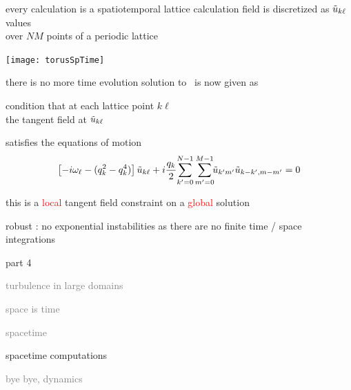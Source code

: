 \begin{frame}{every calculation is a spatiotemporal lattice calculation}
field is discretized as
$\tilde{u}_{k\ell}$ values  \\ over
$N M$ points of a periodic lattice


\begin{center}
\texttt{[image: torusSpTime]}
\end{center}
\end{frame}


\begin{frame}{there is no more time evolution}
solution to \KS\ is now given as
\begin{block}{condition that}
at each lattice point $k\ell$ \\
the tangent field at $\tilde{u}_{k\ell}$
\end{block}
satisfies the equations of motion
\[
\left[- i \omega_\ell - ( q_k^2 - q_k^4 ) \right]\tilde{u}_{k\ell}
+ i \frac{q_k}{2} \!\sum_{k'=0}^{N-1} \sum^{M-1}_{m'=0}\!\!
\tilde{u}_{k'm'} \tilde{u}_{k-k',m-m'}
    =
0
\]

\bigskip

this is a \textcolor{red}{local} tangent field constraint on a \textcolor{red}{global} solution

\bigskip

robust : no exponential instabilities as there are no finite time / space integrations

\end{frame}

\begin{frame}{part 4}
\begin{enumerate}
              \item
    \textcolor{gray}{\small
turbulence in large domains
              \item
space is time
              \item
spacetime    }
              \item {\Large
spacetime computations
    }\textcolor{gray}{\small
              \item
bye bye, dynamics
                    }
            \end{enumerate}
\end{frame}


